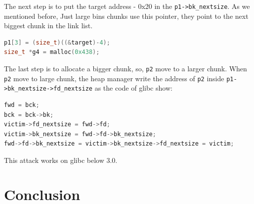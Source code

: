 \documentclass{masterthesis}
\newcommand*\libc{glibc}
\newcommand*\lb{large bins}
\begin{document}
The next step is to put the target address - 0x20 in the \lstinline{p1->bk_nextsize}. As we mentioned before, Just \lb{} chunks use this pointer, they point to the next biggest chunk in the link list.
\begin{lstlisting}[language=c,frame=tlrb]
p1[3] = (size_t)((&target)-4);
size_t *g4 = malloc(0x438);
\end{lstlisting}
The last step is to allocate a bigger chunk, so, \lstinline{p2} move to a larger chunk. When \lstinline{p2} move to large chunk, the heap manager write the address of \lstinline{p2} inside \lstinline{p1->bk_nextsize->fd_nextsize} as the code of \libc{} show:
\begin{lstlisting}[language=c,frame=tlrb]
fwd = bck;
bck = bck->bk;
victim->fd_nextsize = fwd->fd;
victim->bk_nextsize = fwd->fd->bk_nextsize;
fwd->fd->bk_nextsize = victim->bk_nextsize->fd_nextsize = victim;
\end{lstlisting}
This attack works on \libc{} below 3.0.
\chapter{Conclusion}

% 
% 
\end{document}
